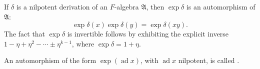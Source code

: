 If $\delta$ is a nilpotent derivation of an $F$-algebra $\mathfrak{A}$, then $\exp \delta$ is an automorphism of $\mathfrak{A}$:
$$\exp \delta(x) \exp \delta(y) = \exp \delta(xy).$$
The fact that $\exp \delta$ is invertible follows by exhibiting the explicit inverse $1 - \eta + \eta^2 - \cdots \pm \eta^{k-1}$, where $\exp \delta = 1 + \eta$.

An automorphism of the form $\exp(\operatorname{ad} x)$, with $\operatorname{ad} x$ nilpotent, is called .
